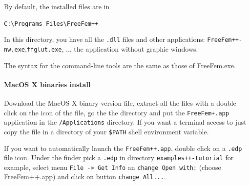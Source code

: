 \documentclass[a4paper,twoside,12pt]{book}
\begin{document}
 By default, the installed files are  in
  \begin{center}
  \verb!C:\Programs Files\FreeFem++!
  \end{center}
  In this directory, you have all the \texttt{.dll} files and
    other applications: \texttt{FreeFem++-nw.exe},\texttt{ffglut.exe}, ...  the \freefempp application
    without graphic windows.
\medskip


The syntax for the command-line tools are the same as those of FreeFem.exe.


\paragraph{MacOS X  binaries install}


  Download the MacOS X binary version file, extract all the files with a double click on the
  icon of the file, go the the directory and put the \texttt{FreeFem+.app} application in the
  \texttt{/Applications} directory.
  If you want a terminal access to \freefempp just copy the file \freefempp in a
   directory of your \verb!$PATH! shell environment variable.

  If you want to automatically launch the \texttt{FreeFem++.app}, double click on a \texttt{.edp} file icon.
  Under the finder pick a \texttt{.edp} in directory \texttt{examples++-tutorial} for example,
  select menu  \texttt{File -> Get Info} an \texttt{change Open with:} (choose FreeFem++.app) and click on button
  \texttt{change All...}.
\end{document}
